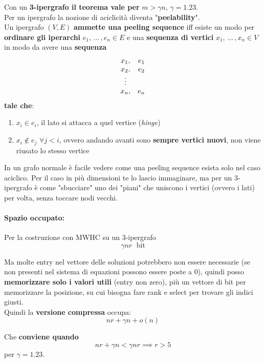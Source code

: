 Con un \textbf{3-ipergrafo il teorema vale per} $m> \gamma n$, $\gamma = 1.23$.\\

Per un ipergrafo la nozione di aciclicità diventa "\textbf{peelability}".\\

Un ipergrafo $(V,E)$ \textbf{ammette una peeling sequence} iff esiste un modo per \textbf{ordinare gli iperarchi} $e_1, \, \dots \, , e_n \in E$ e una \textbf{sequenza di vertici} $x_1, \, \dots \, , x_n \in V$ in modo da avere una \textbf{sequenza}
$$
\begin{array}{c c}
	x_1, & e_1 \\
	x_2, & e_2 \\
	\vdots \\
	x_n, & e_n \\
\end{array}
$$
\textbf{tale che}: 
\begin{enumerate}
	\item $x_i \in e_i$, il lato si attacca a quel vertice (\textit{hinge})
	\item $x_i \notin e_j$ $\forall j < i$, ovvero andando avanti sono \textbf{sempre vertici nuovi}, non viene riusato lo stesso vertice
\end{enumerate}
In un grafo normale è facile vedere come una peeling sequence esista solo nel caso aciclico. Per il caso in più dimensioni te lo lascio immaginare, ma per un 3-ipergrafo è come "sbucciare" uno dei "piani" che uniscono i vertici (ovvero i lati) per volta, senza toccare nodi vecchi.\\

\newpage

\paragraph{Spazio occupato:} Per la costruzione con MWHC su un 3-ipergrafo 
$$ \gamma n r \; \text{ bit}$$

Ma molte entry nel vettore delle soluzioni potrebbero non essere necessarie (se non presenti nel sistema di equazioni possono essere poste a 0), quindi posso \textbf{memorizzare solo i valori utili} (entry non zero), più un vettore di bit per memorizzare la posizione, su cui bisogna fare rank e select per trovare gli indici giusti.\\

Quindi la \textbf{versione compressa} occupa:
$$ n r + \gamma n + o(n) $$

Che \textbf{conviene quando} 
$$ n r + \gamma n < \gamma n r \implies r > 5$$
per $\gamma = 1.23$.\\

